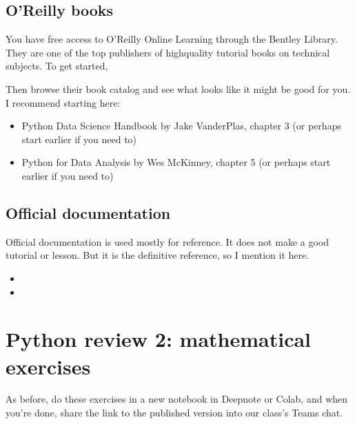 \documentclass[letterpaper,10pt,english]{jupyterBook}
\begin{document}
\subsection{O’Reilly books}
\label{\detokenize{chapter-4-review-of-python-and-pandas:o-reilly-books}}
\sphinxAtStartPar
You have free access to O’Reilly Online Learning through the Bentley Library.  They are one of the top publishers of high\sphinxhyphen{}quality tutorial books on technical subjects.  To get started, 

\sphinxAtStartPar
Then browse their book catalog and see what looks like it might be good for you.  I recommend starting here:
\begin{itemize}
\item {} 
\sphinxAtStartPar
Python Data Science Handbook by Jake VanderPlas, chapter 3 (or perhaps start earlier if you need to)

\item {} 
\sphinxAtStartPar
Python for Data Analysis by Wes McKinney, chapter 5 (or perhaps start earlier if you need to)

\end{itemize}


\subsection{Official documentation}
\label{\detokenize{chapter-4-review-of-python-and-pandas:official-documentation}}
\sphinxAtStartPar
Official documentation is used mostly for reference.  It does not make a good tutorial or lesson.  But it is the definitive reference, so I mention it here.
\begin{itemize}
\item {} 
\sphinxAtStartPar
{}

\item {} 
\sphinxAtStartPar
{}

\end{itemize}


\section{Python review 2: mathematical exercises}
\label{\detokenize{chapter-4-review-of-python-and-pandas:python-review-2-mathematical-exercises}}
\sphinxAtStartPar
As before, do these exercises in a new notebook in Deepnote or Colab, and when you’re done, share the link to the published version into our class’s Teams chat.
\end{document}
